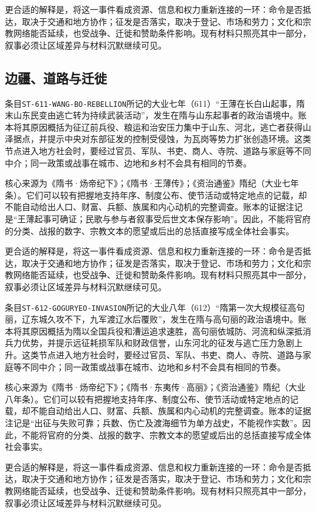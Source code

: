 更合适的解释是，将这一事件看成资源、信息和权力重新连接的一环：命令是否抵达，取决于交通和地方协作；征发是否落实，取决于登记、市场和劳力；文化和宗教网络能否延续，也受战争、迁徙和赞助条件影响。现有材料只照亮其中一部分，叙事必须让区域差异与材料沉默继续可见。

\subsection{边疆、道路与迁徙}

条目\texttt{ST-611-WANG-BO-REBELLION}所记的大业七年（611）“王薄在长白山起事，隋末山东民变由逃亡转为持续武装活动”，发生在隋与山东起事者的政治语境中。账本将其原因概括为征辽前兵役、粮运和治安压力集中于山东、河北，逃亡者获得山泽据点，并提示中央对东部征发的控制受侵蚀，为瓦岗等势力扩张创造环境。这类节点进入地方社会时，要经过官员、军队、书吏、商人、寺院、道路与家庭等不同中介；同一政策或战事在城市、边地和乡村不会具有相同的节奏。

核心来源为《隋书·炀帝纪下》；《隋书·王薄传》；《资治通鉴》隋纪（大业七年条）。它们可以较有把握地支持年序、制度公布、使节活动或特定地点的记载，却不能自动给出人口、财富、兵额、族属和内心动机的完整调查。账本的证据注记是“王薄起事可确证；民歌与参与者叙事受后世文本保存影响”。因此，不能将官府的分类、战报的数字、宗教文本的愿望或后出的总括直接写成全体社会事实。

更合适的解释是，将这一事件看成资源、信息和权力重新连接的一环：命令是否抵达，取决于交通和地方协作；征发是否落实，取决于登记、市场和劳力；文化和宗教网络能否延续，也受战争、迁徙和赞助条件影响。现有材料只照亮其中一部分，叙事必须让区域差异与材料沉默继续可见。

条目\texttt{ST-612-GOGURYEO-INVASION}所记的大业八年（612）“隋第一次大规模征高句丽，辽东城久攻不下，九军渡辽水后覆败”，发生在隋与高句丽的政治语境中。账本将其原因概括为隋以全国兵役和漕运追求速胜，高句丽依城防、河流和纵深抵消兵力优势，并提示远征耗损军队和财政信誉，山东河北的征发与逃亡压力急剧上升。这类节点进入地方社会时，要经过官员、军队、书吏、商人、寺院、道路与家庭等不同中介；同一政策或战事在城市、边地和乡村不会具有相同的节奏。

核心来源为《隋书·炀帝纪下》；《隋书·东夷传·高丽》；《资治通鉴》隋纪（大业八年条）。它们可以较有把握地支持年序、制度公布、使节活动或特定地点的记载，却不能自动给出人口、财富、兵额、族属和内心动机的完整调查。账本的证据注记是“出征与失败可靠；兵数、伤亡及渡海细节为单方战史，不能视作实数”。因此，不能将官府的分类、战报的数字、宗教文本的愿望或后出的总括直接写成全体社会事实。

更合适的解释是，将这一事件看成资源、信息和权力重新连接的一环：命令是否抵达，取决于交通和地方协作；征发是否落实，取决于登记、市场和劳力；文化和宗教网络能否延续，也受战争、迁徙和赞助条件影响。现有材料只照亮其中一部分，叙事必须让区域差异与材料沉默继续可见。

